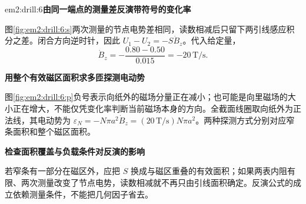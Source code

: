 \begin{drillsolution}{em2:drill:6}\textbf{由同一端点的测量差反演带符号的变化率}\par\nobreak
图\ref{fig:em2:drill:6:s}两次测量的节点电势差相同，读数相减后只留下两引线感应积分之差。闭合方向逆时针，因此 $U_1-U_2=-S\dot B_z$。代入给定量，
\[\dot B_z=-\frac{0.80-0.50}{0.015}=-20\,\mathrm{T/s}.\]



\par\medskip{}\noindent\textbf{用整个有效磁区面积求多匝探测电动势}\par\nobreak
图\ref{fig:em2:drill:6:p}负号表示向纸外的磁场分量正在减小；也可能是向里磁场的大小正在增大，不能仅凭变化率判断当前磁场本身的方向。全截面线圈取向纸外为正法线，其电动势为 $\varepsilon_N=-N\pi a^2\dot B_z=(20\,\mathrm{T/s})N\pi a^2$。两种探测方式分别对应窄条面积和整个磁区面积。



\par\medskip{}\noindent\textbf{检查面积覆盖与负载条件对反演的影响}\par\nobreak
若窄条有一部分在磁区外，应把 $S$ 换成与磁区重叠的有效面积；如果两表内阻有限、两次测量改变了节点电势，读数相减就不再只由引线面积确定。反演公式的成立依赖测量条件，不能把几何因子省去。\end{drillsolution}
